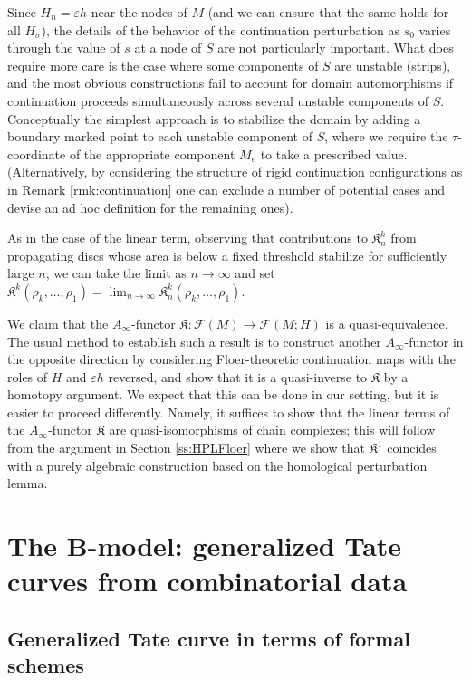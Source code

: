 \documentclass[11pt,leqno]{amsart}
\numberwithin{equation}{section}
\newcommand{\cF}{{\mathcal F}}
\begin{document}
Since $H_n=\varepsilon h$ near the nodes of $M$ (and we can ensure that the
same holds for all $H_\sigma$), the details of the behavior of the continuation
perturbation as $s_0$ varies through the value of $s$ at a node of $S$ are
not particularly important. What does require more care is the case where
some components of $S$ are unstable (strips), and the most obvious 
constructions fail to account for domain automorphisms if continuation
proceeds simultaneously across several unstable components of $S$.
Conceptually the simplest approach is to stabilize the domain by adding a boundary marked
point to each unstable component of $S$, where we require the
$\tau$-coordinate of the appropriate component $M_e$ to take a prescribed
value. (Alternatively, by considering the structure of rigid continuation
configurations as in Remark \ref{rmk:continuation} one can exclude a number
of potential cases and devise an ad hoc definition for the remaining ones).

As in the case of the linear term, observing that contributions to
$\mathfrak{K}_n^k$ from propagating discs whose area is below a fixed threshold
stabilize for sufficiently large $n$, we can take the limit as $n\to\infty$
and set $\mathfrak{K}^k(\rho_k,\dots,\rho_1)=\lim_{n\to \infty}
\mathfrak{K}^k_n(\rho_k,\dots,\rho_1)$.

We claim that the $A_\infty$-functor $\mathfrak{K}:\cF(M)\to \cF(M;H)$ is a quasi-equivalence.
The usual method to establish such a result is to construct another $A_\infty$-functor in the opposite direction by considering
Floer-theoretic continuation maps with the roles of $H$ and $\varepsilon h$
reversed, and show that it is a quasi-inverse to $\mathfrak{K}$ by a homotopy
argument. We expect that this can be done in our setting,
but it is easier to proceed differently. Namely, it suffices to show that
the linear terms of the $A_\infty$-functor $\mathfrak{K}$ are quasi-isomorphisms of chain
complexes; this will follow from the argument in Section \ref{ss:HPLFloer}
where we show that $\mathfrak{K}^1$ coincides with a purely
algebraic construction based on the homological perturbation lemma.


\section{The B-model: generalized Tate curves from combinatorial data} \label{s:Bmodel}

\subsection{Generalized Tate curve in terms of formal schemes}
\end{document}
